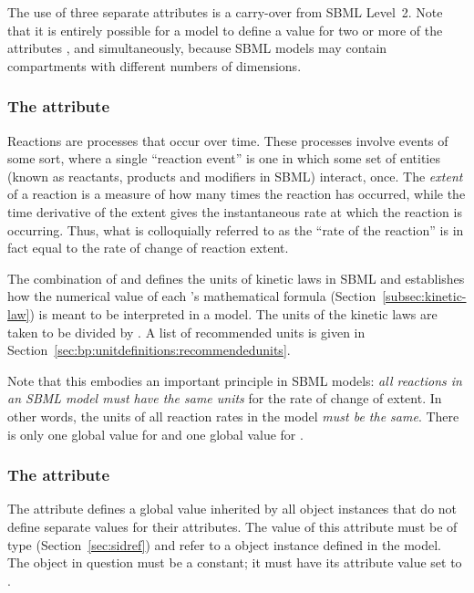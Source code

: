 The use of three separate attributes is a carry-over from SBML
Level~2.  Note that it is entirely possible for a model to define
a value for two or more of the attributes ,
 and  simultaneously, because
SBML models may contain compartments with different numbers of
dimensions.


\subsubsection{The  attribute}
\label{sec:model-extentUnits}
\label{extentunits}

Reactions are processes that occur over time.  These processes
involve events of some sort, where a single ``reaction event'' is
one in which some set of entities (known as reactants, products
and modifiers in SBML) interact, once.  The \emph{extent} of a
reaction is a measure of how many times the reaction has occurred,
while the time derivative of the extent gives the instantaneous
rate at which the reaction is occurring.  Thus, what is
colloquially referred to as the ``rate of the reaction'' is in
fact equal to the rate of change of reaction extent.

The combination of  and 
defines the units of kinetic laws in SBML and establishes how the
numerical value of each \KineticLaw's mathematical formula
(Section~\ref{subsec:kinetic-law}) is meant to be interpreted in a
model.  The units of the kinetic laws are taken to be
 divided by .  A list of
recommended units is given in
Section~\ref{sec:bp:unitdefinitions:recommendedunits}.

Note that this embodies an important principle in SBML models:
\emph{all reactions in an SBML model must have the same units} for
the rate of change of extent.  In other words, the units of all
reaction rates in the model \emph{must be the same}.  There is
only one global value for  and one global value
for .


\subsubsection{The  attribute}
\label{sec:model-conversionFactor}

The attribute  defines a global value
inherited by all \Species object instances that do not define
separate values for their  attributes.  The
value of this attribute must be of type 
(Section~\ref{sec:sidref}) and refer to a \Parameter object
instance defined in the model.  The \Parameter object in question
must be a constant; \ie it must have its 
attribute value set to .

